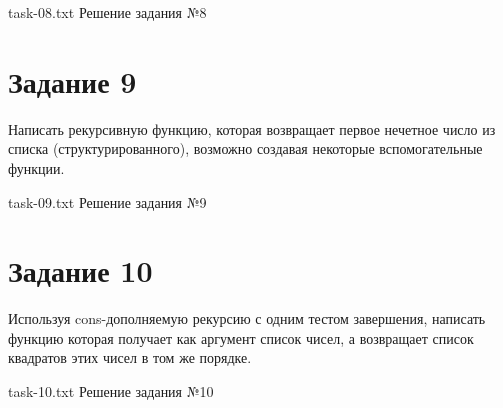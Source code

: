 {task-08.txt} %
{Решение задания №8} %


\section{Задание 9}

Написать рекурсивную функцию, которая возвращает первое нечетное число из списка (структурированного), возможно создавая некоторые вспомогательные функции.

{task-09.txt} %
{Решение задания №9} %

\section{Задание 10}

Используя cons-дополняемую рекурсию с одним тестом завершения, написать функцию которая получает как аргумент список чисел, а возвращает список квадратов этих чисел в том же порядке.

{task-10.txt} %
{Решение задания №10} %